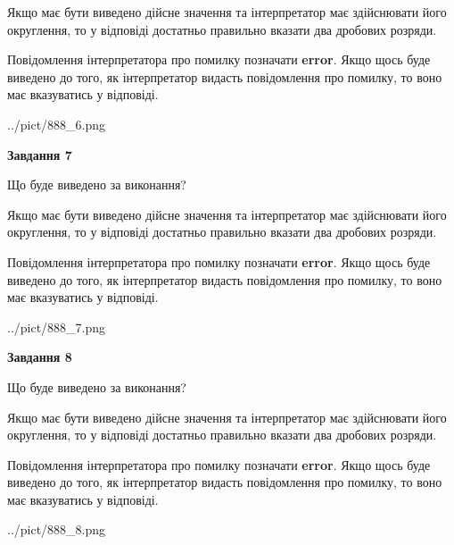 \documentclass[12pt, ukrainian]{article}
\begin{document}
{\begin {Large}
Якщо має бути виведено дійсне значення та інтерпретатор має здійснювати його округлення, 
то у відповіді достатньо правильно вказати два дробових розряди.

Повідомлення інтерпретатора про помилку позначати \textbf{error}.
Якщо щось буде виведено до того, як інтерпретатор видасть повідомлення про помилку, 
то воно має вказуватись у відповіді. \par

\begin{center}
	{../pict/888_6.png}
\end{center}
\newpage

{\begin {center}\textbf{Завдання 7}\end {center}}\par
Що буде виведено за виконання? \par

Якщо має бути виведено дійсне значення та інтерпретатор має здійснювати його округлення, 
то у відповіді достатньо правильно вказати два дробових розряди.

Повідомлення інтерпретатора про помилку позначати \textbf{error}.
Якщо щось буде виведено до того, як інтерпретатор видасть повідомлення про помилку, 
то воно має вказуватись у відповіді. \par

\begin{center}
	{../pict/888_7.png}
\end{center}
\newpage

{\begin {center}\textbf{Завдання 8}\end {center}}\par
Що буде виведено за виконання? \par

Якщо має бути виведено дійсне значення та інтерпретатор має здійснювати його округлення, 
то у відповіді достатньо правильно вказати два дробових розряди.

Повідомлення інтерпретатора про помилку позначати \textbf{error}.
Якщо щось буде виведено до того, як інтерпретатор видасть повідомлення про помилку, 
то воно має вказуватись у відповіді. \par

\begin{center}
	{../pict/888_8.png}
\end{center}
\newpage


\end{Large}}
\end{document}
